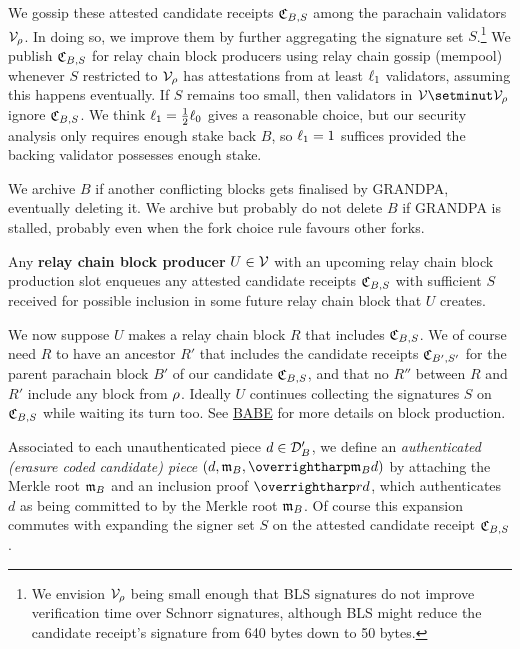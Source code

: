 We gossip these attested candidate receipts $\mathfrak{C}_{B,S}$ among the parachain validators $\mathcal{V}_{\rho}$.  
%
In doing so, we improve them by further aggregating the signature set $S$.\footnote{We envision $\mathcal{V}_{\rho}$ being small enough that BLS signatures do not improve verification time over Schnorr signatures, although BLS might reduce the candidate receipt's signature from 640 bytes down to 50 bytes.}  We publish $\mathfrak{C}_{B,S}$ for relay chain block producers using relay chain gossip (mempool) whenever $S$ restricted to $\mathcal{V}_\rho$ has attestations from at least $\ell_1$ validators, assuming this happens eventually.  If $S$ remains too small, then validators in $\vals \setminut \vals_\rho$ ignore $\mathfrak{C}_{B,S}$.
We think $\ell_1 = {1\over2} \ell_0$ gives a reasonable choice, but our security analysis only requires enough stake back $B$, so $\ell_1 = 1$ suffices provided the backing validator possesses enough stake.

We archive $B$ if another conflicting blocks gets finalised by GRANDPA, eventually deleting it.  We archive but probably do not delete $B$ if GRANDPA is stalled, probably even when the fork choice rule favours other forks.  


Any {\bf relay chain block producer} $U \in \mathcal{V}$ with an upcoming relay chain block production slot enqueues any attested candidate receipts $\mathfrak{C}_{B,S}$ with sufficient $S$ received for possible inclusion in some future relay chain block that $U$ creates.  

We now suppose $U$ makes a relay chain block $R$ that includes $\mathfrak{C}_{B,S}$.  We of course need $R$ to have an ancestor $R'$ that includes the candidate receipts $\mathfrak{C}_{B',S'}$ for the parent parachain block $B'$ of our candidate $\mathfrak{C}_{B,S}$, and that no $R''$ between $R$ and $R'$ include any block from $\rho$.  Ideally $U$ continues collecting the signatures $S$ on $\mathfrak{C}_{B,S}$ while waiting its turn too.  See \href{http://research.web3.foundation/en/latest/polkadot/BABE/Babe/}{BABE} for more details on block production.

Associated to each unauthenticated piece $d \in \mathcal{D}'_B$, we define an {\em authenticated (erasure coded candidate) piece} $(d,\merkleroot_B,\vect{\merkleroot_B d})$ by attaching the Merkle root $\mathfrak{m}_B$ and an inclusion proof $\vect{rd}$, which authenticates $d$ as being committed to by the Merkle root $\mathfrak{m}_B$.  Of course this expansion commutes with expanding the signer set $S$ on the attested candidate receipt $\mathfrak{C}_{B,S}$.

